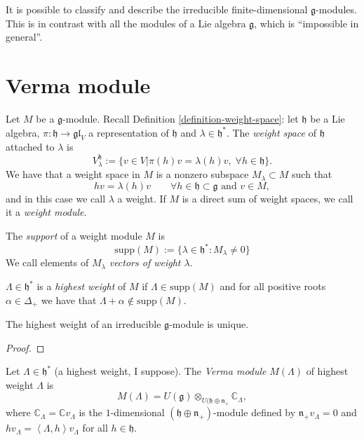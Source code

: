 It is possible to classify and describe the 
irreducible finite-dimensional
$\mathfrak{g}$-modules. This is in contrast
with all the modules of a Lie algebra $\mathfrak{g}$,
which is ``impossible in general''.

\section{Verma module}
\label{section-Verma-module}

Let $M$ be a $\mathfrak{g}$-module. Recall 
Definition \ref{definition-weight-space}: 
let $\mathfrak{h}$ be a Lie algebra, 
$\pi:\mathfrak{h}\to\mathfrak{gl}_V$ a representation of $\mathfrak{h}$ 
and $\lambda \in \mathfrak{h}^*$. The {\it weight space} of $\mathfrak{h}$
attached to $\lambda$ is
$$
V_\lambda^{\mathfrak{h}}:=\{v \in V|\pi(h)v=\lambda(h)v,\; 
\forall h \in \mathfrak{h}\}.
$$
We have
that a weight space in $M$ is a nonzero subspace
$M_\lambda \subset M$ such that
$$
hv=\lambda(h)v \qquad \forall h \in \mathfrak{h}\subset\mathfrak{g}
\text{ and }v \in M,
$$
and in this case we call $\lambda$ a weight.
If $M$ is a direct sum of weight spaces, we
call it a {\it weight module}.

The {\it support} of a weight module $M$ is
\begin{equation}
\label{equation-support-of-weight-module}
\text{supp}(M):=\{\lambda \in \mathfrak{h}^*:M_\lambda\neq 0\}
\end{equation}
We call elements of $M_\lambda$ {\it vectors
of weight $\lambda$}.

\begin{definition}
\label{definition-highest-root}
$\Lambda \in \mathfrak{h}^*$ is a 
{\it highest weight} of $M$ 
if $\Lambda \in \text{supp}(M)$
and for all positive roots $\alpha \in \Delta_+$
we have that $\Lambda+\alpha \not\in\text{supp}(M)$.
\end{definition}

\begin{exercise}
\label{exercise-highest-weight-of-an-irreducible-g-module-is-unique}
The highest weight of an irreducible $\mathfrak{g}$-module
is unique.
\end{exercise}

\begin{proof}

\end{proof}

\begin{definition}
\label{definition-Verma-module}
\begin{reference}
\cite[Definition 4.1]{jethro-rt}
\end{reference}
Let $\Lambda \in \mathfrak{h}^*$
(a highest weight, I suppose).
The {\it Verma module} $M(\Lambda)$
of highest weight $\Lambda$ is
$$
M(\Lambda)=U(\mathfrak{g})\otimes_{U(\mathfrak{h}\oplus \mathfrak{n}_+}
\mathbb{C}_\Lambda,
$$
where $\mathbb{C}_\Lambda=\mathbb{C}v_\Lambda$
is the $1$-dimensional $(\mathfrak{h} \oplus \mathfrak{n}_+)$-module
defined by $\mathfrak{n}_+v_\Lambda=0$
and $hv_\Lambda=\left<\Lambda,h\right>v_\Lambda$
for all $h \in \mathfrak{h}$.
\end{definition}

